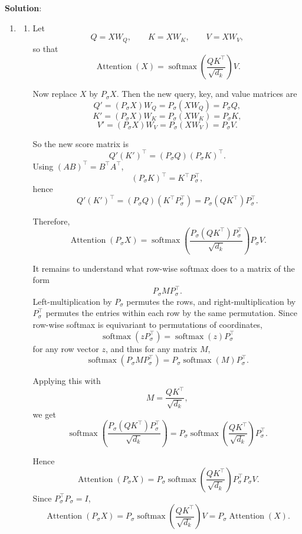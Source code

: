 \documentclass[submit]{harvardml}
\newenvironment{solution}{
    \vspace{2mm}
    \color{blue}\noindent\textbf{Solution}:
}{}
\begin{document}
\begin{solution}
\begin{enumerate}
\begin{enumerate}
Now use the variance rule
\[
\operatorname{Var}(cX)=c^2\operatorname{Var}(X).
\]
Therefore,
\[
\operatorname{Var}\!\left(\frac{q^\top k}{\sqrt{d_k}}\right)
=
\frac{1}{d_k}\operatorname{Var}(q^\top k)
=
\frac{1}{d_k}\cdot d_k
=
1.
\]

Hence, after scaling by \(1/\sqrt{d_k}\), the dot product has variance
\[
\boxed{1}
\]
independently of \(d_k\).
        \end{enumerate}
\item \begin{enumerate}
    \item Let
\[
Q=XW_Q,\qquad K=XW_K,\qquad V=XW_V,
\]
so that
\[
\operatorname{Attention}(X)
=
\operatorname{softmax}\!\left(\frac{QK^\top}{\sqrt{d_k}}\right)V.
\]

Now replace \(X\) by \(P_\sigma X\). Then the new query, key, and value matrices are
\[
Q'=(P_\sigma X)W_Q=P_\sigma(XW_Q)=P_\sigma Q,
\]
\[
K'=(P_\sigma X)W_K=P_\sigma(XW_K)=P_\sigma K,
\]
\[
V'=(P_\sigma X)W_V=P_\sigma(XW_V)=P_\sigma V.
\]

So the new score matrix is
\[
Q'(K')^\top
=
(P_\sigma Q)(P_\sigma K)^\top.
\]
Using \((AB)^\top=B^\top A^\top\),
\[
(P_\sigma K)^\top = K^\top P_\sigma^\top,
\]
hence
\[
Q'(K')^\top
=
(P_\sigma Q)(K^\top P_\sigma^\top)
=
P_\sigma (QK^\top) P_\sigma^\top.
\]

Therefore,
\[
\operatorname{Attention}(P_\sigma X)
=
\operatorname{softmax}\!\left(
\frac{P_\sigma(QK^\top)P_\sigma^\top}{\sqrt{d_k}}
\right) P_\sigma V.
\]

It remains to understand what row-wise softmax does to a matrix of the form
\[
P_\sigma M P_\sigma^\top.
\]
Left-multiplication by \(P_\sigma\) permutes the rows, and right-multiplication by \(P_\sigma^\top\) permutes the entries within each row by the same permutation. Since row-wise softmax is equivariant to permutations of coordinates,
\[
\operatorname{softmax}(zP_\sigma^\top)=\operatorname{softmax}(z)P_\sigma^\top
\]
for any row vector \(z\), and thus for any matrix \(M\),
\[
\operatorname{softmax}(P_\sigma M P_\sigma^\top)
=
P_\sigma \operatorname{softmax}(M) P_\sigma^\top.
\]

Applying this with
\[
M=\frac{QK^\top}{\sqrt{d_k}},
\]
we get
\[
\operatorname{softmax}\!\left(
\frac{P_\sigma(QK^\top)P_\sigma^\top}{\sqrt{d_k}}
\right)
=
P_\sigma
\operatorname{softmax}\!\left(\frac{QK^\top}{\sqrt{d_k}}\right)
P_\sigma^\top.
\]

Hence
\[
\operatorname{Attention}(P_\sigma X)
=
P_\sigma
\operatorname{softmax}\!\left(\frac{QK^\top}{\sqrt{d_k}}\right)
P_\sigma^\top P_\sigma V.
\]
Since \(P_\sigma^\top P_\sigma = I\),
\[
\operatorname{Attention}(P_\sigma X)
=
P_\sigma
\operatorname{softmax}\!\left(\frac{QK^\top}{\sqrt{d_k}}\right)V
=
P_\sigma \operatorname{Attention}(X).
\]


\end{enumerate}
\end{enumerate}
\end{solution}
\end{document}
